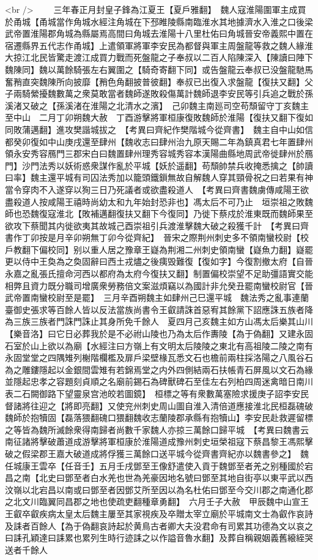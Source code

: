 <br />
　　三年春正月封皇子鋒為江夏王【夏戶雅翻】　魏人寇淮陽圍軍主成買於甬城【甬城當作角城水經注角城在下邳睢陵縣南臨淮水其地據濟水入淮之口後梁武帝置淮陽郡角城為縣屬焉高間曰角城去淮陽十八里杜佑曰角城晉安帝義熙中置在宿遷縣界五代志作甬城】上遣領軍將軍李安民為都督與軍主周盤龍等救之魏人緣淮大掠江北民皆驚走渡江成買力戰而死盤龍之子奉叔以二百人陷陳深入【陳讀曰陣下魏陳同】魏以萬餘騎張左右翼圍之【騎奇寄翻下同】或告盤龍云奉叔已没盤龍馳馬奮矟直突魏陳所向披靡【矟色角翻披普彼翻】奉叔已出復入求盤龍【復扶又翻】父子兩騎縈擾魏數萬之衆莫敢當者魏師遂敗殺傷萬計魏師退李安民等引兵追之戰於孫溪渚又破之【孫溪渚在淮陽之北清水之濱】　己卯魏主南廵司空苟頹留守丁亥魏主至中山　二月丁卯朔魏大赦　丁酉游擊將軍桓康復敗魏師於淮陽【復扶又翻下復如同敗蒲邁翻】進攻樊諧城拔之　【考異曰齊紀作樊階城今從齊書】　魏主自中山如信都癸卯復如中山庚戌還至肆州【魏收志曰肆州治九原天賜二年為鎮真君七年置肆州領永安秀容鴈門三郡宋白曰魏置肆州理秀容城秀容本漢陽曲縣地周武帝徙肆州於鴈門】沙門法秀以妖術惑衆謀作亂於平城【妖於遥翻】苟頹帥禁兵收掩悉擒之【帥讀曰率】魏主還平城有司囚法秀加以籠頭鐵鎻無故自解魏人穿其頸骨祝之曰若果有神當令穿肉不入遂穿以狥三日乃死議者或欲盡殺道人　【考異曰齊書魏虜傳咸陽王欲盡殺道人按咸陽王禧時尚幼太和九年始封恐非也】馮太后不可乃止　垣崇祖之敗魏師也恐魏復寇淮北【敗補邁翻復扶又翻下今復同】乃徙下蔡戍於淮東既而魏師果至欲攻下蔡聞其内徙欲夷其故城己酉崇祖引兵渡淮擊魏大破之殺獲千計　【考異曰齊書作丁卯按是月辛卯朔無丁卯今從齊紀】　晉宋之際荆州刺史多不領南蠻校尉【校戶教翻下偏校同】别以重人居之豫章王嶷為荆湘二州刺史領南蠻【嶷魚力翻】嶷罷更以侍中王奐為之奐固辭曰西土戎燼之後痍毁難復【復如字】今復割撤太府【自晉永嘉之亂張氏擅命河西以都府為太府今復扶又翻】制置偏校崇望不足助彊語實交能相弊且資力既分職司增廣衆勞務倍文案滋煩竊以為國計非允癸丑罷南蠻校尉官【晉武帝置南蠻校尉至是罷】　三月辛酉朔魏主如肆州己巳還平城　魏法秀之亂事連蘭臺御史張求等百餘人皆以反法當族尚書令王叡請誅首惡宥其餘黨下詔應誅五族者降為三族三族者門誅門誅止其身所免千餘人　夏四月己亥魏主如方山馮太后樂其山川【樂音洛】曰它日必葬我於是不必祔山陵也乃為太后作夀陵【為于偽翻】又建永固石室於山上欲以為廟【水經注曰方嶺上有文明太后陵陵之東北有高祖陵二陵之南有永固堂堂之四隅雉列榭階欄檻及扉戶梁壁椽瓦悉文石也檐前兩柱採洛陽之八風谷石為之雕鏤隱起以金銀間雲雉有若錦焉堂之内外四側結兩石扶帳青石屏風以文石為緣並隱起忠孝之容題刻貞順之名廟前錫石為碑獸碑石至佳左右列柏四周迷禽暗日南川表二石闕御路下望靈泉宫池皎若圖鏡】　桓標之等有衆數萬塞險求援庚子詔李安民督諸將往迎之【將即亮翻】又使兖州刺史周山圖自淮入清倍道應接淮北民桓磊磈破魏師於抱犢固【磊落猥翻磈口猥翻魏收志蘭陵郡承縣有抱犢山】李安民赴救遲留標之等皆為魏所滅餘衆得南歸者尚數千家魏人亦掠三萬餘口歸平城　【考異曰魏書云南征諸將擊破蕭道成游擊將軍桓康於淮陽道成豫州刺史垣榮祖寇下蔡昌黎王馮熙擊破之假梁郡王嘉大破道成將俘獲三萬餘口送平城今從齊書齊紀亦以魏書參之】　魏任城康王雲卒【任音壬】五月壬戌鄧至王像舒遣使入貢于魏鄧至者羌之别種國於宕昌之南【北史曰鄧至者白水羌也世為羌豪因地名號曰鄧至其地自街亭以東平武以西汶嶺以北宕昌以南或曰鄧至者因鄧艾所至因以為名杜佑曰鄧至今交川郡之南通化郡之北文川臨翼同昌郡之地也使疏吏翻種章勇翻】　六月壬子大赦　甲辰魏中山宣王王叡卒叡疾病太皇太后魏主屢至其家視疾及卒贈太宰立廟於平城南文士為叡作哀詩及誄者百餘人【為于偽翻哀詩起於黄鳥古者卿大夫没君命有司累其功德為文以哀之曰誄孔穎達曰誄累也累列生時行迹誄之以作謚音魯水翻】及葬自稱親姻義舊縗絰哭送者千餘人